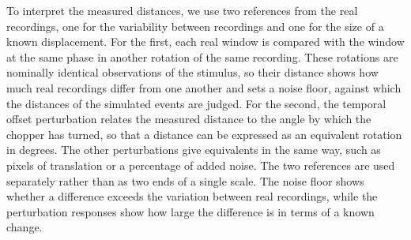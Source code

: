 To interpret the measured distances, we use two references from the real recordings, one for the variability between recordings and one for the size of a known displacement. For the first, each real window is compared with the window at the same phase in another rotation of the same recording. These rotations are nominally identical observations of the stimulus, so their distance shows how much real recordings differ from one another and sets a noise floor, against which the distances of the simulated events are judged. For the second, the temporal offset perturbation relates the measured distance to the angle by which the chopper has turned, so that a distance can be expressed as an equivalent rotation in degrees. The other perturbations give equivalents in the same way, such as pixels of translation or a percentage of added noise. The two references are used separately rather than as two ends of a single scale. The noise floor shows whether a difference exceeds the variation between real recordings, while the perturbation responses show how large the difference is in terms of a known change.